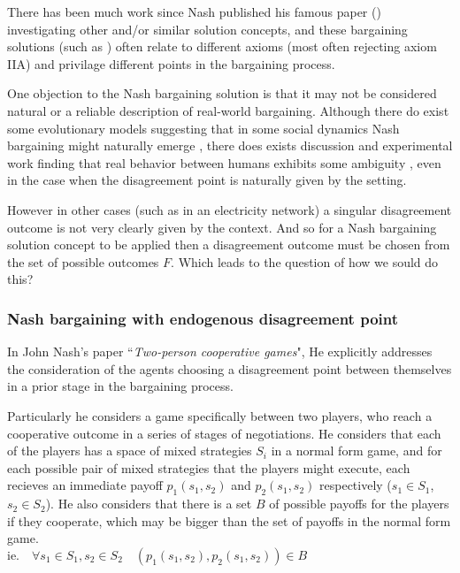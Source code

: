 There has been much work since Nash published his famous paper (\cite{nash1}) investigating other and/or similar solution concepts, and these bargaining solutions (such as \cite{smorodinsky,tempered,tale1,anbarci2002comparing}) often relate to different axioms (most often rejecting axiom IIA) and privilage different points in the bargaining process.

One objection to the Nash bargaining solution is that it may not be considered natural or a reliable description of real-world bargaining.
Although there do exist some evolutionary models suggesting that in some social dynamics Nash bargaining might naturally emerge \cite{articlechoakihiko}, there does exists discussion and experimental work finding that real behavior between humans exhibits some ambiguity \cite{KROLL2014261}, even in the case when the disagreement point is naturally given by the setting.

However in other cases (such as in an electricity network) a singular disagreement outcome is not very clearly given by the context.
And so for a Nash bargaining solution concept to be applied then a disagreement outcome must be chosen from the set of possible outcomes $F$.
Which leads to the question of how we sould do this?

\subsubsection{Nash bargaining with endogenous disagreement point}

In John Nash's paper ``\textit{Two-person cooperative games}"\cite{nash2}, He explicitly addresses the consideration of the agents choosing a disagreement point between themselves in a prior stage in the bargaining process.

Particularly he considers a game specifically between two players, who reach a cooperative outcome in a series of stages of negotiations.
He considers that each of the players has a space of mixed strategies $S_i$ in a normal form game, and for each possible pair of mixed strategies that the players might execute, each recieves an immediate payoff $p_1(s_1,s_2)$ and $p_2(s_1,s_2)$ respectively ($s_1\in S_1$, $s_2\in S_2$).
He also considers that there is a set $B$ of possible payoffs for the players if they cooperate, which may be bigger than the set of payoffs in the normal form game.\\
$\text{ie.}\quad \forall s_1\in S_1,s_2\in S_2 \quad (p_1(s_1,s_2), p_2(s_1,s_2)) \in B$

